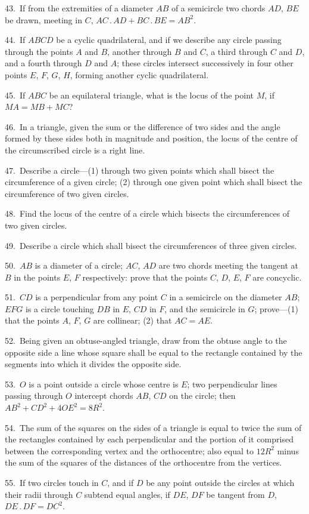 \documentclass[oneside]{book}
\begin{document}
\begin{footnotesize}
43.~If from the extremities of a diameter $AB$ of a semicircle
two chords $AD$, $BE$ be drawn, meeting in $C$, $AC\,.\,AD + BC\,.\,BE
= AB^{2}$.

44.~If $ABCD$ be a cyclic quadrilateral, and if we describe any
circle passing through the points $A$ and $B$, another through $B$
and $C$, a third through $C$ and $D$, and a fourth through $D$ and $A$;
these circles intersect\label{circlesin} successively in four other points $E$, $F$, $G$, $H$,
forming another cyclic quadrilateral.

45.~If $ABC$ be an equilateral triangle, what is the locus of the
point $M$, if $MA = MB + MC$?

46.~In a triangle, given the sum or the difference of two sides
and the angle formed by these sides both in magnitude and position,
the locus of the centre of the circumscribed circle is a right line.

47.~Describe a circle---(1) through two given points which
shall bisect the circumference of a given circle; (2) through
one given point which shall bisect the circumference of two
given circles.

48.~Find the locus of the centre of a circle which bisects the
circumferences of two given circles.

49.~Describe a circle which shall bisect the circumferences of
three given circles.

50.~$AB$ is a diameter of a circle; $AC$, $AD$ are two chords meeting
the tangent at $B$ in the points $E$, $F$ respectively: prove that
the points $C$, $D$, $E$, $F$ are concyclic.

51.~$CD$ is a perpendicular from any point $C$ in a semicircle on
the diameter $AB$; $EFG$ is a circle touching $DB$ in $E$, $CD$ in $F$,
and the semicircle in $G$; prove---(1) that the points $A$, $F$, $G$ are
collinear; (2) that $AC = AE$.

52.~Being given an obtuse-angled triangle, draw from the
obtuse angle to the opposite side a line whose square shall be
equal to the rectangle contained by the segments into which it
divides the opposite side.

53.~$O$ is a point outside a circle whose centre is $E$; two perpendicular
lines passing through $O$ intercept chords $AB$, $CD$ on
the circle; then $AB^{2} + CD^{2} + 4OE^{2} = 8R^{2}$.

54.~The sum of the squares on the sides of a triangle is equal
to twice the sum of the rectangles contained by each perpendicular
and the portion of it comprised between the corresponding vertex
and the orthocentre; also equal to $12R^{2}$ minus the sum of the
squares of the distances of the orthocentre from the vertices.

55.~If two circles touch in $C$, and if $D$ be any point outside the
circles at which their radii through $C$ subtend equal angles, if
$DE$, $DF$ be tangent from $D$, $DE\,.\,DF=DC^{2}$.
\end{footnotesize}
\end{document}
